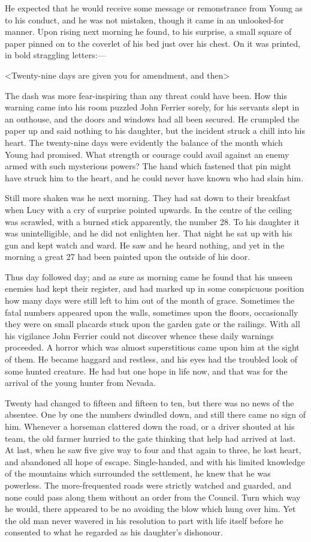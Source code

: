 He expected that he would receive some message or remonstrance from Young as to his conduct, and he was not mistaken, though it came in an unlooked-for manner. Upon rising next morning he found, to his surprise, a small square of paper pinned on to the coverlet of his bed just over his chest. On it was printed, in bold straggling letters:—

<Twenty-nine days are given you for amendment, and then\longdash>

The dash was more fear-inspiring than any threat could have been. How this warning came into his room puzzled John Ferrier sorely, for his servants slept in an outhouse, and the doors and windows had all been secured. He crumpled the paper up and said nothing to his daughter, but the incident struck a chill into his heart. The twenty-nine days were evidently the balance of the month which Young had promised. What strength or courage could avail against an enemy armed with such mysterious powers? The hand which fastened that pin might have struck him to the heart, and he could never have known who had slain him.

Still more shaken was he next morning. They had sat down to their breakfast when Lucy with a cry of surprise pointed upwards. In the centre of the ceiling was scrawled, with a burned stick apparently, the number 28. To his daughter it was unintelligible, and he did not enlighten her. That night he sat up with his gun and kept watch and ward. He saw and he heard nothing, and yet in the morning a great 27 had been painted upon the outside of his door.

Thus day followed day; and as sure as morning came he found that his unseen enemies had kept their register, and had marked up in some conspicuous position how many days were still left to him out of the month of grace. Sometimes the fatal numbers appeared upon the walls, sometimes upon the floors, occasionally they were on small placards stuck upon the garden gate or the railings. With all his vigilance John Ferrier could not discover whence these daily warnings proceeded. A horror which was almost superstitious came upon him at the sight of them. He became haggard and restless, and his eyes had the troubled look of some hunted creature. He had but one hope in life now, and that was for the arrival of the young hunter from Nevada.

Twenty had changed to fifteen and fifteen to ten, but there was no news of the absentee. One by one the numbers dwindled down, and still there came no sign of him. Whenever a horseman clattered down the road, or a driver shouted at his team, the old farmer hurried to the gate thinking that help had arrived at last. At last, when he saw five give way to four and that again to three, he lost heart, and abandoned all hope of escape. Single-handed, and with his limited knowledge of the mountains which surrounded the settlement, he knew that he was powerless. The more-frequented roads were strictly watched and guarded, and none could pass along them without an order from the Council. Turn which way he would, there appeared to be no avoiding the blow which hung over him. Yet the old man never wavered in his resolution to part with life itself before he consented to what he regarded as his daughter's dishonour.

